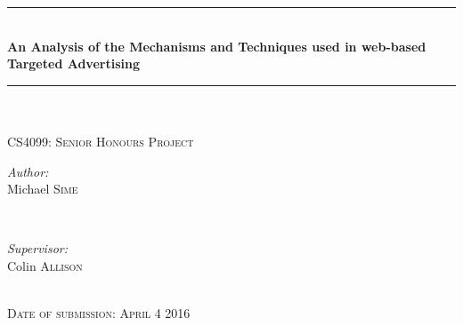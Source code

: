 \documentclass[12pt]{article}
\begin{document}
\begin{titlepage}

\newcommand{\HRule}{\rule{\linewidth}{0.5mm}} %

\center %


\HRule \\[0.4cm]
{ \Huge \bfseries An Analysis of the Mechanisms and Techniques used in web-based Targeted Advertising}\\
\HRule \\[1.5cm]



\\
 


\textsc{\Large CS4099: Senior Honours Project}\\[1cm]

 

\begin{minipage}{0.4\textwidth}
\begin{flushleft} \large
\emph{Author:}\\
Michael \textsc{Sime} %
\end{flushleft}
\end{minipage}
~
\begin{minipage}{0.4\textwidth}
\begin{flushright} \large
\emph{Supervisor:} \\
Colin \textsc{Allison} %
\end{flushright}
\end{minipage}\\[1.5cm]



\textsc{\Medium Date of submission: April 4 2016}\\[2cm] 

\vfill %

\end{titlepage}
\end{document}
